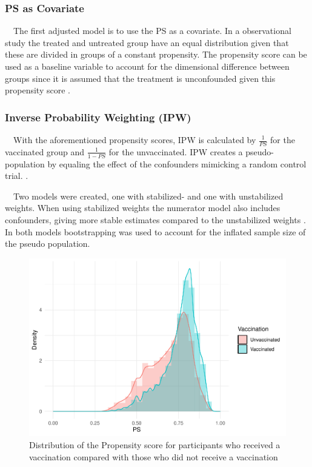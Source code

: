 \documentclass[
]{article}
\begin{document}
\hypertarget{ps-as-covariate}{%
\subsubsection{PS as Covariate}\label{ps-as-covariate}}

~~The first adjusted model is to use the PS as a covariate. In a observational study the treated and untreated group have an equal distribution given that these are divided in groups of a constant propensity. The propensity score can be used as a baseline variable to account for the dimensional difference between groups since it is assumed that the treatment is unconfounded given this propensity score \citep{schafer}.

\hypertarget{inverse-probability-weighting-ipw}{%
\subsubsection{Inverse Probability Weighting (IPW)}\label{inverse-probability-weighting-ipw}}

~~With the aforementioned propensity scores, IPW is calculated by \(\frac{1}{PS}\) for the vaccinated group and \(\frac{1}{1-PS}\) for the unvaccinated. IPW creates a pseudo-population by equaling the effect of the confounders mimicking a random control trial. \citep{shiba}.

~~Two models were created, one with stabilized- and one with unstabilized weights. When using stabilized weights the numerator model also includes confounders, giving more stable estimates compared to the unstabilized weights \citep{ipw}. In both models bootstrapping was used to account for the inflated sample size of the pseudo population.

\begin{figure}
\includegraphics[width=0.7\linewidth]{Assignment_files/figure-latex/psscore-1} \caption{Distribution of the Propensity score for participants who received a vaccination compared with those who did not receive a vaccination}\label{fig:psscore}
\end{figure}
\end{document}
